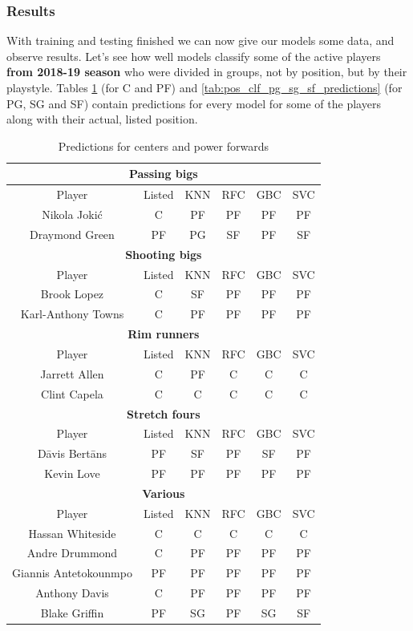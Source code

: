 \documentclass[a4paper]{article}
\begin{document}
\subsubsection{Results}
\label{subsubsec:pos_clf_res}

With training and testing finished we can now give our models some data, and observe results. Let's see how well models classify some of the active players \textbf{from 2018-19 season} who were divided in groups, not by position, but by their playstyle. Tables \ref{tab:pos_clf_c_pf_predictions} (for C and PF) and \ref{tab:pos_clf_pg_sg_sf_predictions} (for PG, SG and SF) contain predictions for every model for some of the players along with their actual, listed position.

\begin{table}[!h]
\begin{center}
\begin{tabular}{|c|c|c|c|c|c|} \hline
\multicolumn{6}{|c|}{\textbf{Passing bigs}} \\ \hline
Player & Listed & KNN & RFC & GBC & SVC \\ \hline
Nikola Jokić & C & PF & PF & PF & PF \\ \hline
Draymond Green & PF & PG & SF & PF & SF \\ \hline
\multicolumn{6}{|c|}{\textbf{Shooting bigs}} \\ \hline
Player & Listed & KNN & RFC & GBC & SVC \\ \hline
Brook Lopez & C & SF & PF  & PF & PF \\ \hline
Karl-Anthony Towns & C & PF  & PF & PF & PF  \\ \hline
\multicolumn{6}{|c|}{\textbf{Rim runners}} \\ \hline
Player & Listed & KNN & RFC & GBC & SVC \\ \hline
Jarrett Allen & C & PF & C & C & C  \\ \hline
Clint Capela & C & C & C & C & C \\ \hline
\multicolumn{6}{|c|}{\textbf{Stretch fours}} \\ \hline
Player & Listed & KNN & RFC & GBC & SVC \\ \hline
Dāvis Bertāns & PF & SF & PF & SF & PF \\ \hline
Kevin Love & PF & PF & PF & PF & PF \\ \hline
\multicolumn{6}{|c|}{\textbf{Various}} \\ \hline
Player & Listed & KNN & RFC & GBC & SVC \\ \hline
Hassan Whiteside & C & C & C & C & C \\ \hline
Andre Drummond & C & PF & PF & PF & PF \\ \hline
Giannis Antetokounmpo & PF & PF & PF & PF & PF \\ \hline
Anthony Davis & C & PF & PF & PF & PF \\ \hline
Blake Griffin & PF & SG & PF & SG & SF \\ \hline
\end{tabular}
\caption{Predictions for centers and power forwards}
\label{tab:pos_clf_c_pf_predictions}
\end{center}
\end{table}
\end{document}
